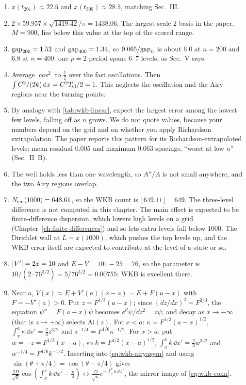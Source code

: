 \begin{enumerate}
\item[13.] $x(t_{201})\approx22.5$ and $x(t_{300})\approx28.5$, matching Sec.~III.
\item[14.] $2\times59.957\times\sqrt{1419.42}/\pi=1438.06$. The largest scale-2 basis in the paper, $M=900$, lies below this value at the top of the scored range.
\item[15.] $\mathrm{gap}_{200}=1.52$ and $\mathrm{gap}_{400}=1.34$, so $9.065/\mathrm{gap}_n$ is about $6.0$ at $n=200$ and $6.8$ at $n=400$: one $p=2$ period spans 6--7 levels, as Sec.~V says.
\item[17.] Average $\cos^2$ to $\frac12$ over the fast oscillations. Then $\int C^2/(2k)\,\mathrm{d} x=C^2T_{\rm cl}/2=1$. This neglects the oscillation and the Airy regions near the turning points.
\item[19.] By analogy with \cref{tab:wkb-linear}, expect the largest error among the lowest few levels, falling off as $n$ grows. We do not quote values, because your numbers depend on the grid and on whether you apply Richardson extrapolation. The paper reports this pattern for its Richardson-extrapolated levels: mean residual $0.005$ and maximum $0.063$ spacings, ``worst at low $n$'' (Sec.~II~B).
\item[20.] The well holds less than one wavelength, so $A''/A$ is not small anywhere, and the two Airy regions overlap.
\item[21.] $N_{\mathrm{sm}}(1000)=648.61$, so the WKB count is $\lfloor649.11\rfloor=649$. The three-level difference is not computed in this chapter. The main effect is expected to be finite-difference dispersion, which lowers high levels on a grid (Chapter~\ref{ch:finite-differences}) and so lets extra levels fall below $1000$. The Dirichlet wall at $L=x(1000)$, which pushes the top levels up, and the WKB error itself are expected to contribute at the level of a state or so.
\item[23.] $\left\lvert V'\right\rvert=2x=10$ and $E-V=101-25=76$, so the parameter is $10/(2\cdot76^{3/2})=5/76^{3/2}=0.00755$: WKB is excellent there.
\item[25.] Near $a$, $V(x)\approx E+V'(a)(x-a)=E+F(a-x)$ with $F=-V'(a)>0$. Put $z=F^{1/3}(a-x)$; since $(dz/dx)^2=F^{2/3}$, the equation $\psi''=F(a-x)\psi$ becomes $\dd^2\psi/\dd z^2=z\psi$, and decay as $x\to-\infty$ (that is $z\to+\infty$) selects $\mathrm{Ai}(z)$. For $x<a$: $\kappa=F^{1/2}(a-x)^{1/2}$, $\int_x^a\kappa\,\dd x'=\frac23z^{3/2}$ and $z^{-1/4}=F^{1/6}\kappa^{-1/2}$. For $x>a$: put $w=-z=F^{1/3}(x-a)$, so $k=F^{1/2}(x-a)^{1/2}$, $\int_a^xk\,\dd x'=\frac23w^{3/2}$ and $w^{-1/4}=F^{1/6}k^{-1/2}$. Inserting into \cref{eq:wkb-airyasym} and using $\sin(\theta+\pi/4)=\cos(\theta-\pi/4)$ gives $\frac{2D}{\sqrt k}\cos(\int_a^xk\,\dd x'-\frac\pi4)\leftrightarrow\frac{D}{\sqrt\kappa}e^{-\int_x^a\kappa\,\dd x'}$, the mirror image of \cref{eq:wkb-conn}.

\end{enumerate}

